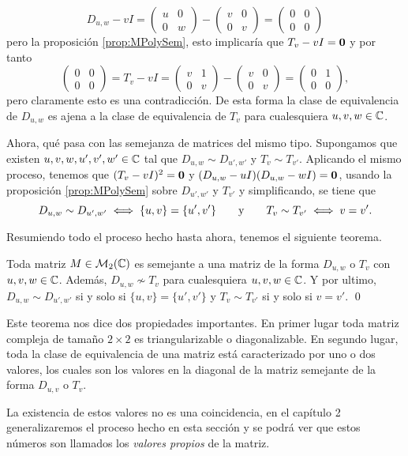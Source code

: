 \[
  D_{u,w} - vI = \begin{pmatrix} u & 0 \\ 0 & w \end{pmatrix} - \begin{pmatrix} v & 0 \\ 0 & v \end{pmatrix}
  = \begin{pmatrix} 0 & 0 \\ 0 & 0 \end{pmatrix}
\]
pero la proposición \ref{prop:MPolySem}, esto implicaría que $T_v - vI  = \mathbf{0}$ y por tanto
\[
  \begin{pmatrix} 0 & 0 \\ 0 & 0 \end{pmatrix} = T_v - vI = \begin{pmatrix} v & 1 \\ 0 & v \end{pmatrix} - \begin{pmatrix} v & 0 \\ 0 & v \end{pmatrix} = \begin{pmatrix}
    0 & 1 \\ 0 & 0 \end{pmatrix},
\]
pero claramente esto es una contradicción. De esta forma la clase de equivalencia de $D_{u,w}$ es ajena a la clase de equivalencia de $T_v$ para cualesquiera $u,v,w \in \mathbb{C}$.

Ahora, qué pasa con las semejanza de matrices del mismo tipo. Supongamos que existen $u, v, w, u', v', w' \in \mathbb{C}$ tal que $D_{u,w} \sim D_{u',w'}$ y $T_v \sim T_{v'}$. Aplicando el mismo proceso, tenemos que $(T_v - vI)^2 = \mathbf{0}$ y $(D_{u,w} - uI)(D_{u,w} - wI) = \mathbf{0}$, usando la proposición \ref{prop:MPolySem} sobre $D_{u',w'}$ y $T_{v'}$ y simplificando, se tiene que 
\[
  D_{u,w} \sim D_{u',w'} \iff \{u,v\} = \{u',v'\}
    \qquad\text{y}\qquad
  T_v \sim T_{v'} \iff v = v'.
\]

Resumiendo todo el proceso hecho hasta ahora, tenemos el siguiente teorema.
\begin{teor} \label{teor:TDMat2x2}
  Toda matriz $M \in \mathcal{M}_2(\mathbb{C})$ es semejante a una matriz de la forma $D_{u,w}$ o $T_v$ con $u,v,w \in \mathbb{C}$. Además, $D_{u,w} \nsim T_v$ para cualesquiera $u,v,w \in \mathbb{C}$. Y por ultimo, $D_{u,w} \sim D_{u',w'}$ si y solo si $\{u,v\} = \{u',v'\}$ y $T_v \sim T_{v'}$ si y solo si $v = v'$. \qed
\end{teor}

Este teorema nos dice dos propiedades importantes. En primer lugar toda matriz compleja de tamaño $2 \times 2$ es triangularizable o diagonalizable. En segundo lugar, toda la clase de equivalencia de una matriz está caracterizado por uno o dos valores, los cuales son los valores en la diagonal de la matriz semejante de la forma $D_{u,v}$ o $T_v$.

La existencia de estos valores no es una coincidencia, en el capítulo 2 generalizaremos el proceso hecho en esta sección y se podrá ver que estos números son llamados los \emph{valores propios} de la matriz.